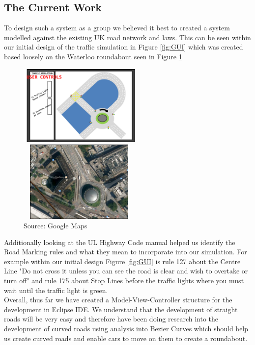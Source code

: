 \documentclass[a4paper,11pt]{article}
\begin{document}
\subsection{The Current Work}%
To design such a system as a group we believed it best to created a system modelled against the existing UK road network and laws. This can be seen within our initial design of the traffic simulation in Figure \ref{fig:GUI} which was created based loosely on the Waterloo roundabout seen in Figure \ref{fig:Waterloo}

\begin{figure}[ht]%
\centering
\begin{minipage}[b]{0.45\linewidth}
		\includegraphics[width=6cm,height=4cm]{UserControls.png} 
	\caption*{ }
	\label{fig:GUI}
\end{minipage}
\begin{minipage}[b]{0.45\linewidth}
	\includegraphics[width=6cm, height=4cm]{WATERLOO.png} 	
	\caption*{Source: Google Maps}
	\label{fig:Waterloo}
\end{minipage}

\end{figure}

Additionally looking at the UL Highway Code manual helped us identify the Road Marking rules and what they mean to  incorporate into our simulation. For example within our initial design Figure \ref{fig:GUI} is rule 127 about the Centre Line "Do not cross it unless you can see the road is clear and wish to overtake or turn off" and rule 175 about Stop Lines before the traffic lights where you must wait until the traffic light is green.\\Overall, thus far we have created a Model-View-Controller structure for the development in Eclipse IDE. We understand that the development of straight roads will be very easy and therefore have been doing research into the development of curved roads using analysis into Bezier Curves which should help us create curved roads and enable cars to move on them to create a roundabout.\\ 
\end{document}
